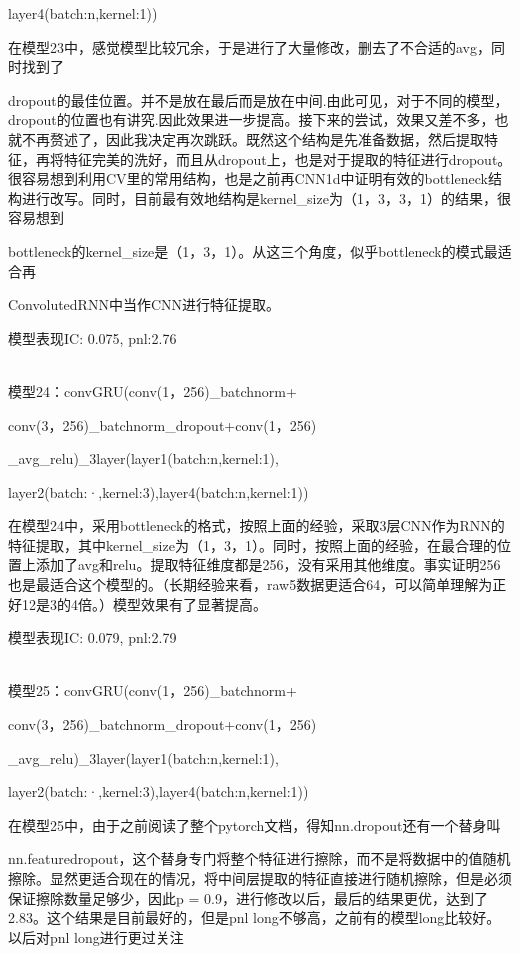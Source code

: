 \documentclass[11pt]{ctexart}
\begin{document}
layer4(batch:n,kernel:1))

在模型23中，感觉模型比较冗余，于是进行了大量修改，删去了不合适的avg，同时找到了 \par dropout的最佳位置。并不是放在最后而是放在中间.由此可见，对于不同的模型，dropout的位置也有讲究.因此效果进一步提高。接下来的尝试，效果又差不多，也就不再赘述了，因此我决定再次跳跃。既然这个结构是先准备数据，然后提取特征，再将特征完美的洗好，而且从dropout上，也是对于提取的特征进行dropout。很容易想到利用CV里的常用结构，也是之前再CNN1d中证明有效的bottleneck结构进行改写。同时，目前最有效地结构是kernel\_size为（1，3，3，1）的结果，很容易想到 \par bottleneck的kernel\_size是（1，3，1）。从这三个角度，似乎bottleneck的模式最适合再 \par ConvolutedRNN中当作CNN进行特征提取。

模型表现{\kaishu \small IC: 0.075, pnl:2.76}


~\\
模型24：convGRU(conv(1，256)\_batchnorm+

conv(3，256)\_batchnorm\_dropout+conv(1，256)

\_avg\_relu)\_3layer(layer1(batch:n,kernel:1), 

layer2(batch:·,kernel:3),layer4(batch:n,kernel:1))

在模型24中，采用bottleneck的格式，按照上面的经验，采取3层CNN作为RNN的特征提取，其中kernel\_size为（1，3，1）。同时，按照上面的经验，在最合理的位置上添加了avg和relu。提取特征维度都是256，没有采用其他维度。事实证明256也是最适合这个模型的。（长期经验来看，raw5数据更适合64，可以简单理解为正好12是3的4倍。）模型效果有了显著提高。

模型表现{\kaishu \small IC: 0.079, pnl:2.79}

~\\
模型25：convGRU(conv(1，256)\_batchnorm+

conv(3，256)\_batchnorm\_dropout+conv(1，256)

\_avg\_relu)\_3layer(layer1(batch:n,kernel:1),

 layer2(batch:·,kernel:3),layer4(batch:n,kernel:1))

在模型25中，由于之前阅读了整个pytorch文档，得知nn.dropout还有一个替身叫 \par nn.featuredropout，这个替身专门将整个特征进行擦除，而不是将数据中的值随机擦除。显然更适合现在的情况，将中间层提取的特征直接进行随机擦除，但是必须保证擦除数量足够少，因此p = 0.9，进行修改以后，最后的结果更优，达到了2.83。这个结果是目前最好的，但是pnl long不够高，之前有的模型long比较好。以后对pnl long进行更过关注
\end{document}
